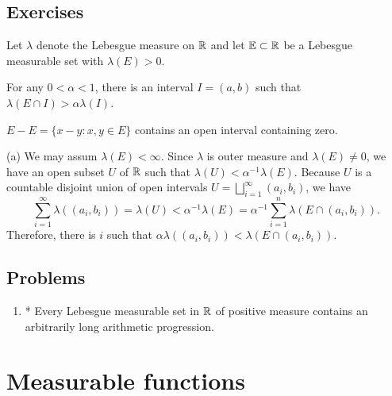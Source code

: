 \documentclass{../../large}
\begin{document}
\begin{prb}
\end{prb}


\section*{Exercises}

\begin{prb}
Let $\lambda$ denote the Lebesgue measure on $\mathbb{R}$ and let $\mathbb{E}\subset\mathbb{R}$ be a Lebesgue measurable set with $\lambda(E)>0$.
\begin{parts}
\item For any $0<\alpha<1$, there is an interval $I=(a,b)$ such that $\lambda(E\cap I)>\alpha\lambda(I)$.
\item $E-E=\{x-y:x,y\in E\}$ contains an open interval containing zero.
\end{parts}
\begin{pf}
(a)
We may assum $\lambda(E)<\infty$.
Since $\lambda$ is outer measure and $\lambda(E)\ne0$, we have an open subset $U$ of $\mathbb{R}$ such that $\lambda(U)<\alpha^{-1}\lambda(E)$.
Because $U$ is a countable disjoint union of open intervals $U=\bigsqcup_{i=1}^\infty(a_i,b_i)$, we have
\[\sum_{i=1}^\infty\lambda((a_i,b_i))=\lambda(U)<\alpha^{-1}\lambda(E)=\alpha^{-1}\sum_{i=1}^n\lambda(E\cap(a_i,b_i)).\]
Therefore, there is $i$ such that $\alpha\lambda((a_i,b_i))<\lambda(E\cap(a_i,b_i))$.
\end{pf}
\end{prb}




\section*{Problems}
\begin{enumerate}
\item* Every Lebesgue measurable set in $\mathbb{R}$ of positive measure contains an arbitrarily long arithmetic progression.
\end{enumerate}

















\chapter{Measurable functions}
\end{document}
